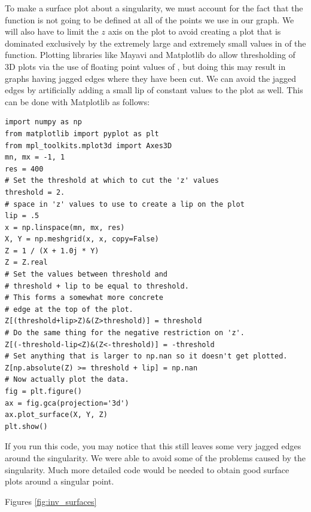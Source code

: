 To make a surface plot about a singularity, we must account for the fact that the function is not going to be defined at all of the points we use in our graph.
We will also have to limit the $z$ axis on the plot to avoid creating a plot that is dominated exclusively by the extremely large and extremely small values in of the function.
Plotting libraries like Mayavi and Matplotlib do allow thresholding of 3D plots via the use of floating point values of , but doing this may result in graphs having jagged edges where they have been cut.
We can avoid the jagged edges by artificially adding a small lip of constant values to the plot as well.
This can be done with Matplotlib as follows:
\begin{lstlisting}
import numpy as np
from matplotlib import pyplot as plt
from mpl_toolkits.mplot3d import Axes3D
mn, mx = -1, 1
res = 400
# Set the threshold at which to cut the 'z' values
threshold = 2.
# space in 'z' values to use to create a lip on the plot
lip = .5
x = np.linspace(mn, mx, res)
X, Y = np.meshgrid(x, x, copy=False)
Z = 1 / (X + 1.0j * Y)
Z = Z.real
# Set the values between threshold and
# threshold + lip to be equal to threshold.
# This forms a somewhat more concrete
# edge at the top of the plot.
Z[(threshold+lip>Z)&(Z>threshold)] = threshold
# Do the same thing for the negative restriction on 'z'.
Z[(-threshold-lip<Z)&(Z<-threshold)] = -threshold
# Set anything that is larger to np.nan so it doesn't get plotted.
Z[np.absolute(Z) >= threshold + lip] = np.nan
# Now actually plot the data.
fig = plt.figure()
ax = fig.gca(projection='3d')
ax.plot_surface(X, Y, Z)
plt.show()
\end{lstlisting}
If you run this code, you may notice that this still leaves some very jagged edges around the singularity.
We were able to avoid some of the problems caused by the singularity.
Much more detailed code would be needed to obtain good surface plots around a singular point.

Figures \ref{fig:inv_surfaces} %


